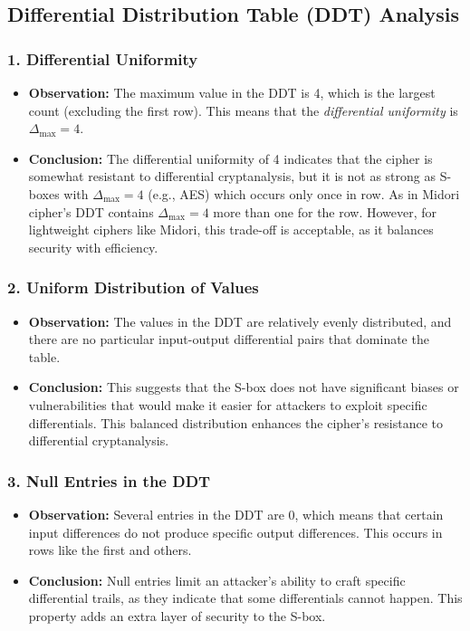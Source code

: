 \subsection{Differential Distribution Table (DDT) Analysis}

\subsubsection*{1. Differential Uniformity}
\begin{itemize}
	\item \textbf{Observation:} The maximum value in the DDT is 4, which is the
	      largest count (excluding the first row). This means that the
	      \textit{differential uniformity} is \( \Delta_{\text{max}} = 4 \).

	\item \textbf{Conclusion:} The differential uniformity of 4 indicates that
	      the cipher is somewhat resistant to differential cryptanalysis, but it is
	      not as strong as S-boxes with \( \Delta_{\text{max}} = 4 \) (e.g., AES)
	      which occurs only once in row.  As in Midori cipher's DDT contains  \(
	      \Delta_{\text{max}} = 4 \) more than one for the row.  However, for
	      lightweight ciphers like Midori, this trade-off is acceptable, as it
	      balances security with efficiency.
\end{itemize}

\subsubsection*{2. Uniform Distribution of Values}
\begin{itemize}
	\item
	      \textbf{Observation:} The values in the DDT are relatively evenly distributed,
	      and there are no particular input-output differential pairs that dominate the
	      table.
	\item
	      \textbf{Conclusion:} This suggests that the S-box does not have significant
	      biases or vulnerabilities that would make it easier for attackers to exploit
	      specific differentials. This balanced distribution enhances the cipher's
	      resistance to differential cryptanalysis.
\end{itemize}

\subsubsection*{3. Null Entries in the DDT}
\begin{itemize}
	\item
	      \textbf{Observation:} Several entries in the DDT are 0, which means
	      that certain input differences do not produce specific output
	      differences. This occurs in rows like the first and others.
	\item
	      \textbf{Conclusion:} Null entries limit an attacker’s ability to craft
	      specific differential trails, as they indicate that some differentials
	      cannot happen. This property adds an extra layer of security to the
	      S-box.
\end{itemize}

